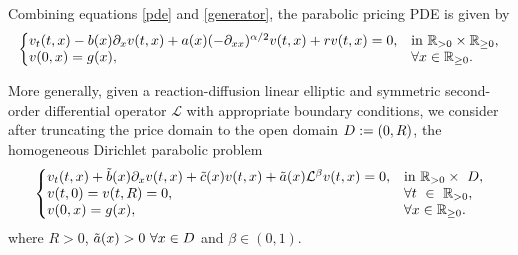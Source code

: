 Combining equations \eqref{pde} and \eqref{generator}, the parabolic pricing PDE is given by
\begin{equation*} \label{pricing_eq}
\left\{
  \begin{array}{@{}ll@{}}
    v_t(t,x) - b(x)\partial_xv(t,x) + a(x)(-\partial_{xx})^{\alpha/2}v(t,x) + rv(t,x) = 0, & \text{in}\ \mathbb{R}_{>0}\times\mathbb{R}_{\ge0}, \\
    v(0,x) = g(x), & \forall x\in\mathbb{R}_{\ge0}.
  \end{array}\right.
\end{equation*}

More generally, given a reaction-diffusion linear elliptic and symmetric second-order differential operator $\mathcal{L}$ with appropriate boundary conditions, we consider after truncating the price domain to the open domain $D:=(0,R)$, the homogeneous Dirichlet parabolic problem
\begin{equation} \label{gen_pricing_eq}
\left\{
  \begin{array}{@{}ll@{}}
    v_t(t,x) + \tilde{b}(x)\partial_xv(t,x) + \tilde{c}(x)v(t,x) + \tilde{a}(x)\mathcal{L}^{\beta}v(t,x) = 0, & \text{in}\ \mathbb{R}_{>0}\times\ \truncdom, \\
    v(t,0) = v(t,R) = 0, & \forall t \  \in \  \mathbb{R}_{>0},\\
    v(0,x) = g(x), &  \forall  x\in\mathbb{R}_{\ge0}.
  \end{array}\right.
\end{equation}
where $R >0$, $\tilde{a}(x)>0 \ \forall x\in D$ and $\beta \in (0,1).$ \\

